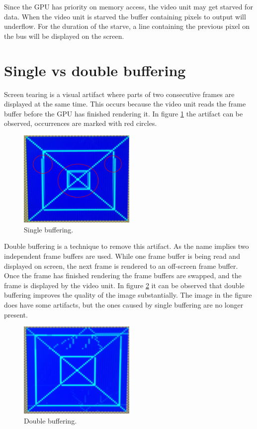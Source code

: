 \documentclass[../main/report.tex]{subfiles}
\begin{document}
Since the GPU has priority on memory access, the video unit may get starved for data.
When the video unit is starved the buffer containing pixels to output will underflow.
For the duration of the starve, a line containing the previous pixel on the bus will be displayed on the screen.

\section{Single vs double buffering}

Screen tearing is a visual artifact where parts of two consecutive frames are displayed at the same time.
This occurs because the video unit reads the frame buffer before the GPU has finished rendering it.  
In figure \ref{fig:single_buffering} the artifact can be observed, occurrences are marked with red circles.

\begin{figure}[H]
	\centering
	\includegraphics[width=0.5\textwidth]{diagrams/single_buffering.png}
	\caption{Single buffering.}
	\label{fig:single_buffering}
\end{figure}
Double buffering is a technique to remove this artifact.
As the name implies two independent frame buffers are used.
While one frame buffer is being read and displayed on screen, 
the next frame is rendered to an off-screen frame buffer.
Once the frame has finished rendering the frame buffers are swapped, and the frame is displayed by the video unit.
In figure \ref{fig:double_buffering} it can be observed that double buffering improves the quality of the image substantially.
The image in the figure does have some artifacts, but the ones caused by single buffering are no longer present.
\begin{figure}[H]
	\centering
	\includegraphics[width=0.5\textwidth]{diagrams/double_buffering.png}
	\caption{Double buffering.}
	\label{fig:double_buffering}
\end{figure}
\end{document}
